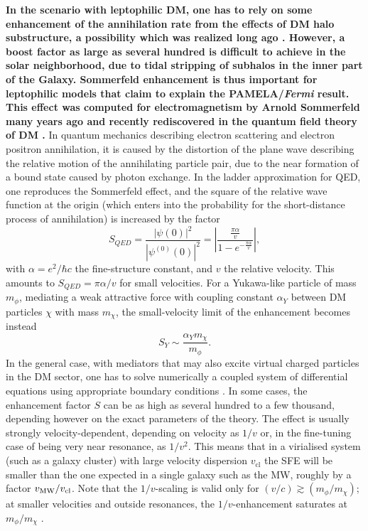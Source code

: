 \documentclass[10pt,aps,pra,reprint,amsmath,amsfonts,amssymb,showpacs,nofootinbib,floatfix]{revtex4-1}
\def\C#1{{\bf #1}}
\newcommand{\Fermi}{{\em Fermi}\xspace}
\newcommand{\rmn}{\mathrm}
\newcommand{\sigv}{v_\rmn{cl}}
\begin{document}
\C{In the scenario with leptophilic DM, one has to rely on some
enhancement of the annihilation rate from the effects of DM halo
substructure, a possibility which was realized long ago
\cite{1993ApJ...411..439S,Bergstrom:1998zs,Moore:1999nt}. However, a
boost factor as large as several hundred is difficult to achieve in
the solar neighborhood, due to tidal stripping of subhalos in the
inner part of the Galaxy. Sommerfeld enhancement is thus important for
leptophilic models that claim to explain the PAMELA/\Fermi
result. This effect was computed for electromagnetism by Arnold
Sommerfeld many years ago \cite{sommerfeld} and recently rediscovered
in the quantum field theory of DM
\cite{2005PhRvD..71f3528H,2007NuPhB.787..152C,2009PhRvD..79a5014A}.}
In quantum mechanics describing electron scattering and electron
positron annihilation, it is caused by the distortion of the plane
wave describing the relative motion of the annihilating particle pair,
due to the near formation of a bound state caused by photon
exchange. In the ladder approximation for QED, one reproduces the
Sommerfeld effect, and the square of the relative wave function at the
origin (which enters into the probability for the short-distance
process of annihilation) is increased by the factor
\cite{2009PhRvD..79a5014A}
\begin{equation}
S_{QED}=\frac{|\psi(0)|^2}{|\psi^{(0)}(0)|^2}=
\left|\frac{\frac{\pi\alpha}{v}}{1-e^{-\frac{\pi\alpha}{v}}}\right|,
\end{equation}
with $\alpha =e^2/\hbar c$ the fine-structure constant, and $v$ the relative
velocity. This amounts to $S_{QED}=\pi\alpha/v$ for small velocities. For a
Yukawa-like particle of mass $m_\phi$, mediating a weak attractive force with
coupling constant $\alpha_Y$ between DM particles $\chi$ with mass
$m_\chi$, the small-velocity limit of the enhancement becomes instead
\begin{equation}
S_Y\sim\frac{\alpha_Y m_\chi}{m_\phi}.
\label{eq:saturation}
\end{equation}
In the general case, with mediators that may also excite virtual
charged particles in the DM sector, one has to solve numerically a
coupled system of differential equations using appropriate boundary
conditions
\cite{2005PhRvD..71f3528H,2007NuPhB.787..152C,2009PhRvD..79a5014A}. In
some cases, the enhancement factor $S$ can be as high as several
hundred to a few thousand, depending however on the exact parameters
of the theory. The effect is usually strongly velocity-dependent,
depending on velocity as $1/v$ or, in the fine-tuning case of being
very near resonance, as $1/v^2$. This means that in a virialised
system (such as a galaxy cluster) with large velocity dispersion
$\sigv$ the SFE will be smaller than the one expected in a single
galaxy such as the MW, roughly by a factor $v_{\rm MW}/\sigv$. Note
that the $1/v$-scaling is valid only for $(v/c) \gtrsim
(m_\phi/m_\chi)$; at smaller velocities and outside resonances, the
$1/v$-enhancement saturates at $m_\phi/m_\chi$
\cite{2008PhRvL.101z1301K}.
\end{document}
